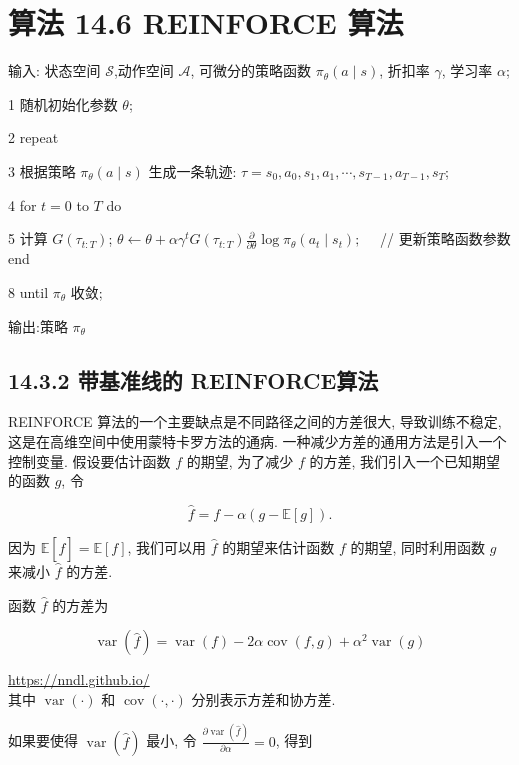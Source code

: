 \documentclass[10pt]{article}
\begin{document}
\section*{算法 14.6 REINFORCE 算法}
输入: 状态空间 $\mathcal{S}$,动作空间 $\mathcal{A}$, 可微分的策略函数 $\pi_{\theta}(a \mid s)$, 折扣率 $\gamma$, 学习率 $\alpha$;

1 随机初始化参数 $\theta$;

2 repeat

3 根据策略 $\pi_{\theta}(a \mid s)$ 生成一条轨迹: $\tau=s_{0}, a_{0}, s_{1}, a_{1}, \cdots, s_{T-1}, a_{T-1}, s_{T}$;

4 for $t=0$ to $T$ do

5 计算 $G\left(\tau_{t: T}\right)$; $\theta \leftarrow \theta+\alpha \gamma^{t} G\left(\tau_{t: T}\right) \frac{\partial}{\partial \theta} \log \pi_{\theta}\left(a_{t} \mid s_{t}\right) ; \quad$ // 更新策略函数参数 end

8 until $\pi_{\theta}$ 收敛;

输出:策略 $\pi_{\theta}$

\subsection*{14.3.2 带基准线的 REINFORCE算法}
REINFORCE 算法的一个主要缺点是不同路径之间的方差很大, 导致训练不稳定, 这是在高维空间中使用蒙特卡罗方法的通病. 一种减少方差的通用方法是引入一个控制变量. 假设要估计函数 $f$ 的期望, 为了减少 $f$ 的方差, 我们引入一个已知期望的函数 $g$, 令


\begin{equation*}
\hat{f}=f-\alpha(g-\mathbb{E}[g]) . \tag{14.57}
\end{equation*}


因为 $\mathbb{E}[\hat{f}]=\mathbb{E}[f]$, 我们可以用 $\hat{f}$ 的期望来估计函数 $f$ 的期望, 同时利用函数 $g$ 来减小 $\hat{f}$ 的方差.

函数 $\hat{f}$ 的方差为


\begin{equation*}
\operatorname{var}(\hat{f})=\operatorname{var}(f)-2 \alpha \operatorname{cov}(f, g)+\alpha^{2} \operatorname{var}(g) \tag{14.58}
\end{equation*}


\href{https://nndl.github.io/}{https://nndl.github.io/}\\
其中 $\operatorname{var}(\cdot)$ 和 $\operatorname{cov}(\cdot, \cdot)$ 分别表示方差和协方差.

如果要使得 $\operatorname{var}(\hat{f})$ 最小, 令 $\frac{\partial \operatorname{var}(\hat{f})}{\partial \alpha}=0$, 得到
\end{document}
